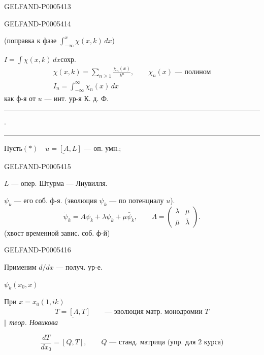 \begin{GelfandAdjacentEvidence}{GELFAND-P000541}{3}

\end{GelfandAdjacentEvidence}
\begin{GelfandAdjacentEvidence}{GELFAND-P000541}{4}

(поправка к фазе \(\int_{-\infty}^{x}\chi(x,k)\,dx\))

\(I=\int\chi(x,k)\,dx\)\quad сохр.
\begin{gather*}
\chi(x,k)=\sum_{n\ge1}\frac{\chi_n(x)}{k^n},
\qquad \chi_n(x)\text{ — полином}\\
I_n=\int_{-\infty}^{\infty}\chi_n(x)\,dx
\end{gather*}
как ф-я от \(u\) — инт. ур-я К. д. Ф.
\hfill\rule{1.60cm}{.35pt}\enspace\(\cdot\)\enspace\rule{1.60cm}{.35pt}\par

Пусть\quad \((*)\quad\underline{\dot u=[A,L]}\) — оп. умн.;
\end{GelfandAdjacentEvidence}
\begin{GelfandAdjacentEvidence}{GELFAND-P000541}{5}

\(L\) — опер. Штурма — Лиувилля.

\(\psi_k\) — его соб. ф-я. (эволюция \(\psi_k\) — по потенциалу \(u\)).
\[
\dot\psi_k=A\psi_k+\lambda\psi_k+\mu\bar\psi_k,\qquad
\Lambda=\begin{pmatrix}\lambda&\mu\\\bar\mu&\bar\lambda\end{pmatrix}.
\]
(хвост временной завис. соб. ф-й)
\end{GelfandAdjacentEvidence}
\begin{GelfandAdjacentEvidence}{GELFAND-P000541}{6}


Применим \(d/dx\) — получ. ур-е.

\(\psi_k(x_0,x)\)

При \(x=x_0\)\quad \((1,ik)\)
\[
\underline{\dot T=[\Lambda,T]}\qquad\text{— эволюция матр. монодромии }T
\]
\hfill\(\Vert\) \textit{теор. Новикова}\par
\[
\frac{dT}{dx_0}=[Q,T],\qquad Q\text{ — станд. матрица (упр. для 2 курса)}
\]
\end{GelfandAdjacentEvidence}
